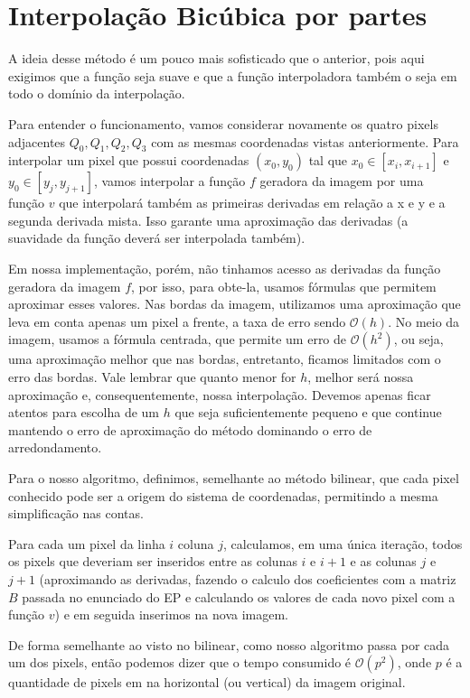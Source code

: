 \documentclass{article}
\begin{document}
	\section{Interpolação Bicúbica por partes}
	A ideia desse método é um pouco mais sofisticado que o anterior, pois aqui exigimos que a função seja suave e que a função interpoladora também o seja em todo o domínio da interpolação. \par
	Para entender o funcionamento, vamos considerar novamente os quatro pixels adjacentes $Q_{0}, Q_{1}, Q_{2}, Q_{3}$ com as mesmas coordenadas vistas anteriormente. Para interpolar um pixel que possui coordenadas $(x_{0}, y_{0})$ tal que $x_{0} \in [x_{i}, x_{i+1}]$ e $y_{0} \in [y_{j}, y_{j+1}]$, vamos interpolar a função $f$ geradora da imagem por uma função $v$ que interpolará também as primeiras derivadas em relação a x e y e a segunda derivada mista. Isso garante uma aproximação das derivadas (a suavidade da função deverá ser interpolada também). \par
	Em nossa implementação, porém, não tinhamos acesso as derivadas da função geradora da imagem $f$, por isso, para obte-la, usamos fórmulas que permitem aproximar esses valores. Nas bordas da imagem, utilizamos uma aproximação que leva em conta apenas um pixel a frente, a taxa de erro sendo $\mathcal{O}(h)$. No meio da imagem, usamos a fórmula centrada, que permite um erro de $\mathcal{O}(h^2)$, ou seja, uma aproximação melhor que nas bordas, entretanto, ficamos limitados com o erro das bordas. Vale lembrar que quanto menor for $h$, melhor será nossa aproximação e, consequentemente, nossa interpolação. Devemos apenas ficar atentos para escolha de um $h$ que seja suficientemente pequeno e que continue mantendo o erro de aproximação do método dominando o erro de arredondamento. \par
	Para o nosso algoritmo, definimos, semelhante ao método bilinear, que cada pixel conhecido pode ser a origem do sistema de coordenadas, permitindo a mesma simplificação nas contas.\par
	Para cada um pixel da linha $i$ coluna $j$, calculamos, em uma única iteração, todos os pixels que deveriam ser inseridos entre as colunas $i$ e $i+1$ e as colunas $j$ e $j+1$ (aproximando as derivadas, fazendo o calculo dos coeficientes com a matriz $B$ passada no enunciado do EP e calculando os valores de cada novo pixel com a função $v$) e em seguida inserimos na nova imagem. \par
	De forma semelhante ao visto no bilinear, como nosso algoritmo passa por cada um dos pixels, então podemos dizer que o tempo consumido é $\mathcal{O}(p^2)$, onde $p$ é a quantidade de pixels em na horizontal (ou vertical) da imagem original.
	
\end{document}
